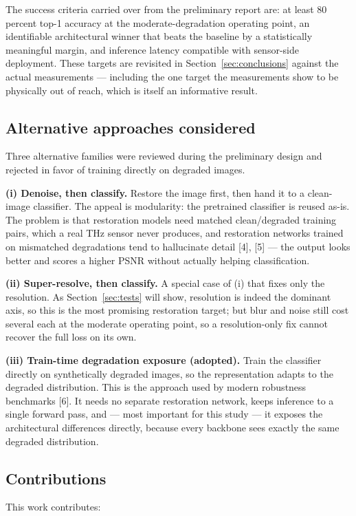 The success criteria carried over from the preliminary report are: at least
80 percent top-1 accuracy at the moderate-degradation operating point, an
identifiable architectural winner that beats the baseline by a statistically
meaningful margin, and inference latency compatible with sensor-side
deployment. These targets are revisited in Section~\ref{sec:conclusions}
against the actual measurements --- including the one target the measurements
show to be physically out of reach, which is itself an informative result.

\subsection{Alternative approaches considered}
Three alternative families were reviewed during the preliminary design and
rejected in favor of training directly on degraded images.

\textbf{(i) Denoise, then classify.}\quad
Restore the image first, then hand it to a clean-image classifier. The appeal
is modularity: the pretrained classifier is reused as-is. The problem is that
restoration models need matched clean/degraded training pairs, which a real
THz sensor never produces, and restoration networks trained on mismatched
degradations tend to hallucinate detail [4], [5] --- the output looks better
and scores a higher PSNR without actually helping classification.

\textbf{(ii) Super-resolve, then classify.}\quad
A special case of (i) that fixes only the resolution. As
Section~\ref{sec:tests} will show, resolution is indeed the dominant axis, so
this is the most promising restoration target; but blur and noise still cost
several \Mpp{} each at the moderate operating point, so a resolution-only
fix cannot recover the full loss on its own.

\textbf{(iii) Train-time degradation exposure (adopted).}\quad
Train the classifier directly on synthetically degraded images, so the
representation adapts to the degraded distribution. This is the approach used
by modern robustness benchmarks [6]. It needs no separate restoration
network, keeps inference to a single forward pass, and --- most important for
this study --- it exposes the architectural differences directly, because
every backbone sees exactly the same degraded distribution.

\subsection{Contributions}
This work contributes:


